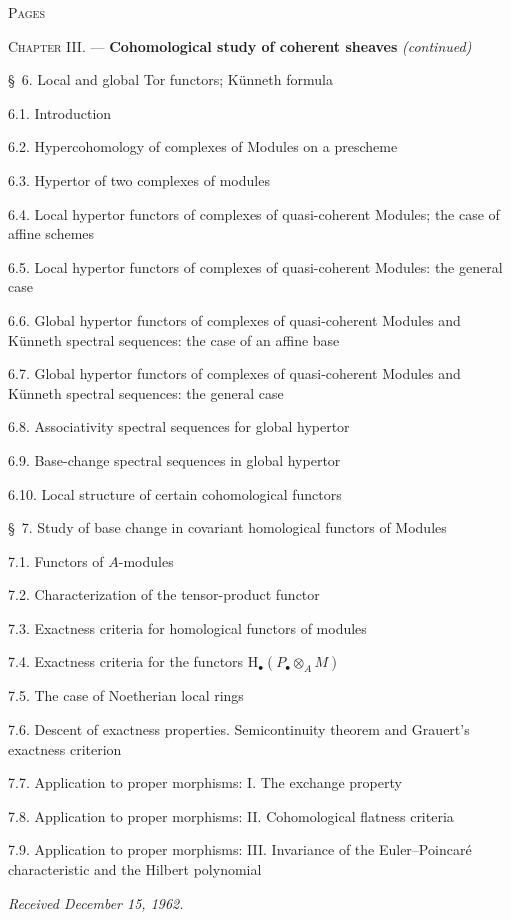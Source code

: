 \begin{flushleft}
\hfill\textsc{Pages}

\textsc{Chapter III.} --- \textbf{Cohomological study of coherent sheaves}
\textit{(continued)} 

\medskip
\S~6. Local and global Tor functors; Künneth formula 

6.1. Introduction 

6.2. Hypercohomology of complexes of Modules on a prescheme 

6.3. Hypertor of two complexes of modules 

6.4. Local hypertor functors of complexes of quasi-coherent Modules; the case
of affine schemes 

6.5. Local hypertor functors of complexes of quasi-coherent Modules: the
general case 

6.6. Global hypertor functors of complexes of quasi-coherent Modules and
Künneth spectral sequences: the case of an affine base 

6.7. Global hypertor functors of complexes of quasi-coherent Modules and
Künneth spectral sequences: the general case 

6.8. Associativity spectral sequences for global hypertor 

6.9. Base-change spectral sequences in global hypertor 

6.10. Local structure of certain cohomological functors 

\medskip
\S~7. Study of base change in covariant homological functors of Modules

7.1. Functors of $A$-modules 

7.2. Characterization of the tensor-product functor 

7.3. Exactness criteria for homological functors of modules 

7.4. Exactness criteria for the functors $\mathrm H_\bullet(P_\bullet\otimes_A M)$

7.5. The case of Noetherian local rings 

7.6. Descent of exactness properties. Semicontinuity theorem and Grauert's
exactness criterion 

7.7. Application to proper morphisms: I. The exchange property 

7.8. Application to proper morphisms: II. Cohomological flatness criteria

7.9. Application to proper morphisms: III. Invariance of the Euler--Poincaré
characteristic and the Hilbert polynomial 

\begin{flushright}
\emph{Received December 15, 1962.}
\end{flushright}
\end{flushleft}

